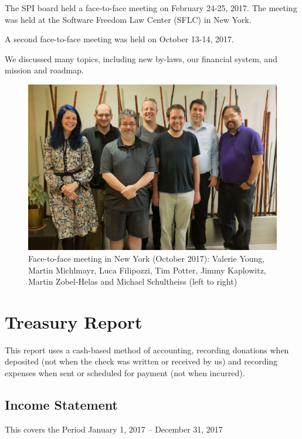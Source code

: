 \documentclass[a4paper]{report}
\begin{document}
The SPI board held a face-to-face meeting on February 24-25, 2017.
The meeting was held at the Software Freedom Law Center (SFLC) in New
York.

A second face-to-face meeting was held on October 13-14, 2017.

We discussed many topics, including new by-laws, our financial system,
and mission and roadmap.

\begin{figure}[h]
\centering

\includegraphics[scale=1.00]{images/2017-october-f2f}

\caption{Face-to-face meeting in New York (October 2017): Valerie Young,
Martin Michlmayr, Luca Filipozzi, Tim Potter, Jimmy Kaplowitz, Martin
Zobel-Helas and Michael Schultheiss (left to right)}

\end{figure}

\chapter{Treasury Report}

This report uses a cash-based method of accounting, recording donations when
deposited (not when the check was written or received by us) and recording
expenses when sent or scheduled for payment (not when incurred).

\section{Income Statement}

This covers the Period January 1, 2017 -- December 31, 2017
\end{document}
